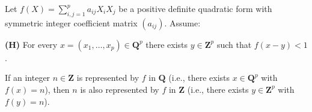 Let $f(X) = \sum_{i,j=1}^{p} a_{ij} X_i X_j$ be a positive definite quadratic form with symmetric integer coefficient matrix $(a_{ij})$. Assume:

\textbf{(H)} For every $x = (x_1, \ldots, x_p) \in \mathbf{Q}^p$ there exists $y \in \mathbf{Z}^p$ such that $f(x-y) < 1$.

If an integer $n \in \mathbf{Z}$ is represented by $f$ in $\mathbf{Q}$ (i.e., there exists $x \in \mathbf{Q}^p$ with $f(x) = n$), then $n$ is also represented by $f$ in $\mathbf{Z}$ (i.e., there exists $y \in \mathbf{Z}^p$ with $f(y) = n$).
